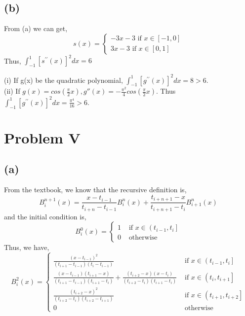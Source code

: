 \documentclass[UTF8]{ctexart}
\begin{document}
\subsection*{(b)}
\noindent From (a) we can get,\\
\begin{equation}
    s(x) = \left\{\begin{array}{l}
        -3x-3 \text{ if } x\in [-1,0]\\
        3x-3 \text{ if } x\in [0,1]
    \nonumber
    \end{array}\right.
\end{equation}
Thus, $\int_{-1}^{1}\left[s^{\prime \prime}(x)\right]^{2} d x=6$

\noindent (i) If g(x) be the quadratic polynomial, $\int_{-1}^{1}\left[g^{\prime \prime}(x)\right]^{2} d x = 8 > 6$.\\
(ii) If $g(x) = cos(\frac{\pi}{2}x), g''(x) = -\frac{\pi ^2}{4}cos(\frac{\pi}{2}x)$. Thus $\int_{-1}^{1}\left[g^{\prime \prime}(x)\right]^{2} d x = \frac{\pi^4}{16} > 6$.

\section*{Problem V}
\subsection*{(a)}
\noindent From the textbook, we know that the recursive definition is,
$$B_{i}^{n+1}(x)=\frac{x-t_{i-1}}{t_{i+n}-t_{i-1}} B_{i}^{n}(x)+\frac{t_{i+n+1}-x}{t_{i+n+1}-t_{i}} B_{i+1}^{n}(x)$$
and the initial condition is,
\begin{equation}
    B_{i}^{0}(x) = \left\{\begin{array}{ll}
        1 & \text { if } x \in\left(t_{i-1}, t_{i}\right] \\
        0 & \text { otherwise }
    \nonumber
    \end{array}\right.
\end{equation}
Thus, we have,
\begin{equation}
    B_{i}^{2}(x) = \left\{\begin{array}{lr}
        \frac{\left(x-t_{i-1}\right)^{2}}{\left(t_{i+1}-t_{i-1}\right)\left(t_{i}-t_{i-1}\right)} & \text { if } x \in\left(t_{i-1}, t_{i}\right] \\
        \frac{\left(x-t_{i-1}\right)\left(t_{i+1}-x\right)}{\left(t_{i+1}-t_{i-1}\right)\left(t_{i+1}-t_{i}\right)}+\frac{\left(t_{i+2}-x\right)\left(x-t_{i}\right)}{\left(t_{i+2}-t_{i}\right)\left(t_{i+1}-t_{i}\right)} & \text { if } x \in\left(t_{i}, t_{i+1}\right] \\
        \frac{\left(t_{i+2}-x\right)^{2}}{\left(t_{i+2}-t_{i}\right)\left(t_{i+2}-t_{i+1}\right)} & \text { if } x \in\left(t_{i+1}, t_{i+2}\right] \\
        0 & \text { otherwise }
    \nonumber
    \end{array}\right.
\end{equation}  
\end{document}
